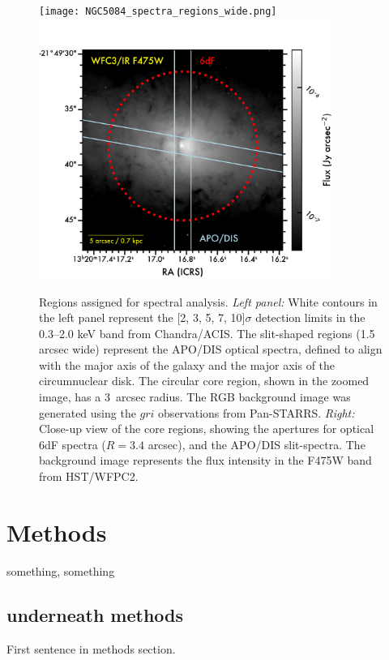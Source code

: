 \documentclass[modern]{CORE-AAS/aastex631}
\begin{document}
{{\begin{figure}[t!]
\begin{center}
\texttt{[image: NGC5084\_spectra\_regions\_wide.png]}\includegraphics[trim={0 0 0 0}, clip, height=8.5cm]{NGC5084_regions_core.png}
\caption{Regions assigned for spectral analysis. \emph{Left panel:} White contours in the left panel represent the [2, 3, 5, 7, 10]$\sigma$ detection limits in the 0.3--2.0 keV band from Chandra/ACIS. The slit-shaped regions (1.5 arcsec wide) represent the APO/DIS optical spectra, defined to align with the major axis of the galaxy and the major axis of the circumnuclear disk. The circular core region, shown in the zoomed image, has a 3~arcsec radius. The RGB background image was generated using the $gri$ observations from Pan-STARRS. \emph{Right:} Close-up view of the core regions, showing the apertures for optical 6dF spectra ($R=3.4$ arcsec), and the APO/DIS slit-spectra. The background image represents the flux intensity in the F475W band from HST/WFPC2.} 
\label{fig:NGC5084_spectra_regions}
\end{center}
\end{figure}

\section{Methods}
\label{sec:methods}

something, something

\subsection{underneath methods}

First sentence in methods section. 


}}
\end{document}
